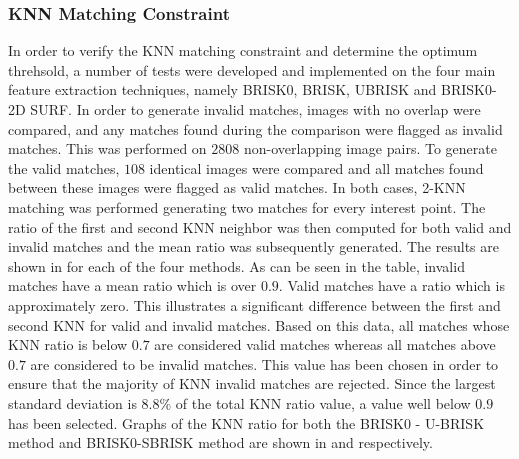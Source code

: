 \documentclass{article}
\begin{document}
\subsubsection{KNN Matching Constraint}
\label{sec:knnMatchingConstraint}
In order to verify the KNN matching constraint and determine the optimum threhsold, a number of tests were developed and implemented on the four main feature extraction techniques, namely BRISK0, BRISK, UBRISK and BRISK0-2D SURF. In order to generate invalid matches, images with no overlap were compared, and any matches found during the comparison were flagged as invalid matches. This was performed on $2808$ non-overlapping image pairs. To generate the valid matches, $108$ identical images were compared and all matches found between these images were flagged as valid matches. In both cases, 2-KNN matching was performed generating two matches for every interest point. The ratio of the first and second KNN neighbor was then computed for both valid and invalid matches and the mean ratio was subsequently generated. The results are shown in  for each of the four methods. As can be seen in the table, invalid matches have a mean ratio which is over $0.9$. Valid matches have a ratio which is approximately zero. This illustrates a significant difference between the first and second KNN for valid and invalid matches. Based on this data, all matches whose KNN ratio is below $0.7$ are considered valid matches whereas all matches above $0.7$ are considered to be invalid matches. This value has been chosen in order to ensure that the majority of KNN invalid matches are rejected. Since the largest standard deviation is $8.8\%$ of the total KNN ratio value, a value well below $0.9$ has been selected. Graphs of the KNN ratio for both the BRISK0 - U-BRISK method and BRISK0-SBRISK method are shown in  and  respectively. \\
\end{document}
